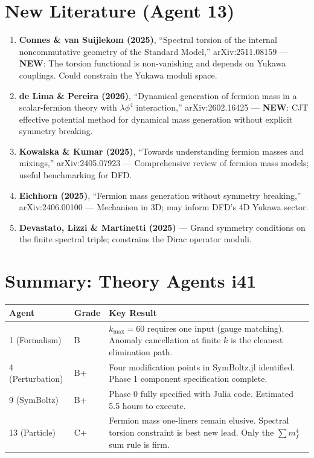 \documentclass[11pt,a4paper]{article}
\newcommand{\NEW}{\textcolor{dfdblue}{\textbf{NEW}}}
\begin{document}
\section{New Literature (Agent 13)}

\begin{enumerate}
\item \textbf{Connes \& van Suijlekom (2025)}, ``Spectral torsion of the internal noncommutative geometry of the Standard Model,'' arXiv:2511.08159 --- \NEW: The torsion functional is non-vanishing and depends on Yukawa couplings. Could constrain the Yukawa moduli space.

\item \textbf{de Lima \& Pereira (2026)}, ``Dynamical generation of fermion mass in a scalar-fermion theory with $\lambda\phi^4$ interaction,'' arXiv:2602.16425 --- \NEW: CJT effective potential method for dynamical mass generation without explicit symmetry breaking.

\item \textbf{Kowalska \& Kumar (2025)}, ``Towards understanding fermion masses and mixings,'' arXiv:2405.07923 --- Comprehensive review of fermion mass models; useful benchmarking for DFD.

\item \textbf{Eichhorn (2025)}, ``Fermion mass generation without symmetry breaking,'' arXiv:2406.00100 --- Mechanism in 3D; may inform DFD's 4D Yukawa sector.

\item \textbf{Devastato, Lizzi \& Martinetti (2025)} --- Grand symmetry conditions on the finite spectral triple; constrains the Dirac operator moduli.
\end{enumerate}


\section*{Summary: Theory Agents i41}

\begin{center}
\begin{tabular}{llp{8cm}}
\toprule
\textbf{Agent} & \textbf{Grade} & \textbf{Key Result} \\
\midrule
1 (Formalism) & B & $k_{\max} = 60$ requires one input (gauge matching). Anomaly cancellation at finite $k$ is the cleanest elimination path. \\
4 (Perturbation) & B+ & Four modification points in SymBoltz.jl identified. Phase 1 component specification complete. \\
9 (SymBoltz) & B+ & Phase 0 fully specified with Julia code. Estimated 5.5 hours to execute. \\
13 (Particle) & C+ & Fermion mass one-liners remain elusive. Spectral torsion constraint is best new lead. Only the $\sum m_f^4$ sum rule is firm. \\
\bottomrule
\end{tabular}
\end{center}
\end{document}

